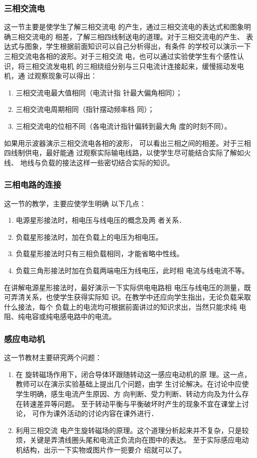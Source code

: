 \subsubsection{三相交流电}

这一节主要是使学生了解三相交流电
的产生，通过三相交流电的表达式和图象明确三相交流电的
相差，了解三相四线制送电的道理。对于三相交流电的产生、
表达式与图象，学生根据前面知识可以自己分析得出，有条件
的学校可以演示一下三相交流电各相的波形。对于三相交流
电，也可以通过实验使学生有个感性认识，将三相交流发电机
的三相绕组分别与三只电流计连接起来，缓慢摇动发电机，通
过观察现象可以得出：
\begin{enumerate}
  \item 三相交流电最大值相同（电流计指
针最大偏角相同）；
\item 三相交流电周期相同（指针摆动频率档
同）；
\item 三相交流电的位相不同（各电流计指针偏转到最大角
度的时刻不同）。
\end{enumerate}
如果用示波器演示三相交流电各相的波形，
可以看出三相之间的相差。对于三相四线制供电，最好能通
过观察实际输电线路，以使学生尽可能结合实际了解如火线、
地线与负载的接法这样一些密切结合实际的知识。

\subsubsection{三相电路的连接}

这一节的教学，主要应使学生明确
以下几点：
\begin{enumerate}
\item 电源星形接法时，相电压与线电压的概念及两
者关系．    \item 负载星形接法时，加在负载上的电压为相电压。
\item 负载星形接法时只有三相负载相同，才能省略中性线。
\item 负载三角形接法时加在负载两端电压为线电压，此时相
电流与线电流不等。
\end{enumerate}

在讲解电源星形接法时，最好演示一下实际供电电路相
电压与线电压的测量，既可弄清关系，也使学生获得实际知
识。在教学中还应向学生指出，无论负载采取什么接法，每个
负载上的电流均可根据前面讲过的知识求出，当然只能求纯
电阻、纯电容或纯电感电路中的电流。

\subsubsection{感应电动机}

这一节教材主要研究两个问题：
\begin{enumerate}
\item 在
旋转磁场作用下，闭合导体环跟随转动这一感应电动机的原
理。这一点，教师可以在演示实验基础上提出几个问题，由学
生讨论解决。在讨论中应使学生明确，感生电流产生原因、方
向判断、受力判断、转动方向及为什么存在转速差异等问题。
至于转动平衡与平衡破坏时产生的现象不宜在课堂上讨论，
可作为课外活动的讨论内容在课外进行．
\item 利用三相交流
电产生旋转磁场的原理。这个道理分析起来并不复杂，只是较烦，关键是弄清线圈头尾和电流正负流向在图中的表达。
至于实际感应电动机结构，出示一下实物或图片作一扼要介
绍就可以了。
\end{enumerate}


